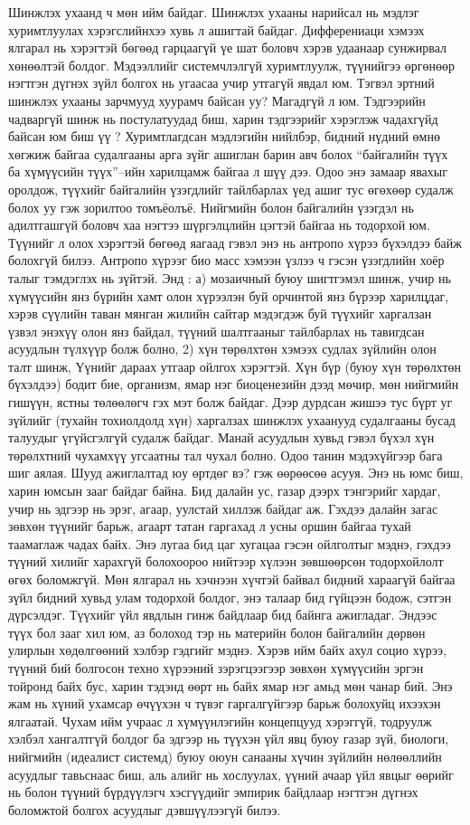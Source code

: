 Шинжлэх ухаанд ч мөн ийм байдаг. Шинжлэх ухааны нарийсал нь мэдлэг хуримтлуулах хэрэгслийнхээ хувь л ашигтай байдаг. Дифферениаци хэмээх ялгарал нь хэрэгтэй бөгөөд гарцаагүй үе шат боловч хэрэв удаанаар сунжирвал хөнөөлтэй болдог. Мэдээллийг системчлэлгүй хуримтлуулж, түүнийгээ өргөнөөр нэгтгэн дүгнэх зүйл болгох нь угаасаа учир утгагүй явдал юм. Тэгвэл эртний шинжлэх ухааны зарчмууд хуурамч байсан уу? Магадгүй л юм. Тэдгээрийн чадваргүй шинж нь постулатуудад биш, харин тэдгээрийг хэрэглэж чадахгүйд байсан юм биш үү ? Хуримтлагдсан мэдлэгийн нийлбэр, бидний нүдний өмнө хөгжиж байгаа судалгааны арга зүйг ашиглан барин авч болох “байгалийн түүх ба хүмүүсийн түүх”–ийн харилцамж байгаа л шүү дээ. Одоо энэ замаар явахыг оролдож, түүхийг байгалийн үзэгдлийг тайлбарлах үед ашиг тус өгөхөөр судалж болох уу гэж зорилтоо томъёолъё.
Нийгмийн болон байгалийн үзэгдэл нь адилтгашгүй боловч хаа нэгтээ шүргэлцлийн цэгтэй байгаа нь тодорхой юм. Түүнийг л олох хэрэгтэй бөгөөд яагаад гэвэл энэ нь антропо хүрээ бүхэлдээ байж болохгүй билээ. Антропо хүрээг био масс хэмээн үзлээ ч гэсэн үзэгдлийн хоёр талыг тэмдэглэх нь зүйтэй. Энд : а) мозаичный буюу шигтгэмэл шинж, учир нь хүмүүсийн янз бүрийн хамт олон хүрээлэн буй орчинтой янз бүрээр харилцдаг, хэрэв сүүлийн таван мянган жилийн сайтар мэдэгдэж буй түүхийг харгалзан үзвэл энэхүү олон янз байдал, түүний шалтгааныг тайлбарлах нь тавигдсан асуудлын түлхүүр болж болно, 2) хүн төрөлхтөн хэмээх судлах зүйлийн олон талт шинж, Үүнийг дараах утгаар ойлгох хэрэгтэй. Хүн бүр (буюу хүн төрөлхтөн бүхэлдээ) бодит бие, организм, ямар нэг биоценезийн дээд мөчир, мөн нийгмийн гишүүн, ястны төлөөлөгч гэх мэт болж байдаг. Дээр дурдсан жишээ тус бүрт уг зүйлийг (тухайн тохиолдолд хүн) харгалзах шинжлэх ухаанууд судалгааны бусад талуудыг үгүйсгэлгүй судалж байдаг. Манай асуудлын хувьд гэвэл бүхэл хүн төрөлхтний чухамхүү угсаатны тал чухал болно.
Одоо танин мэдэхүйгээр бага шиг аялая. Шууд ажиглалтад юу өртдөг вэ? гэж өөрөөсөө асууя. Энэ нь юмс биш, харин юмсын зааг байдаг байна. Бид далайн ус, газар дээрх тэнгэрийг хардаг, учир нь эдгээр нь эрэг, агаар, уулстай хиллэж байдаг аж.
Гэхдээ далайн загас зөвхөн түүнийг барьж, агаарт татан гаргахад л усны оршин байгаа тухай таамаглаж чадах байх. Энэ лугаа бид цаг хугацаа гэсэн ойлголтыг мэднэ, гэхдээ түүний хилийг харахгүй болохоороо нийтээр хүлээн зөвшөөрсөн тодорхойлолт өгөх боломжгүй. Мөн ялгарал нь хэчнээн хүчтэй байвал бидний хараагүй байгаа зүйл бидний хувьд улам тодорхой болдог, энэ талаар бид гүйцээн бодож, сэтгэн дүрсэлдэг.
Түүхийг үйл явдлын гинж байдлаар бид байнга ажигладаг. Эндээс түүх бол зааг хил юм, аз болоход тэр нь материйн болон байгалийн дөрвөн улирлын хөдөлгөөний хэлбэр гэдгийг мэднэ. Хэрэв ийм байх ахул социо хүрээ, түүний бий болгосон техно хүрээний зэрэгцээгээр зөвхөн хүмүүсийн эргэн тойронд байх бус, харин тэдэнд өөрт нь байх ямар нэг амьд мөн чанар бий. Энэ жам нь хүний ухамсар өчүүхэн ч түвэг гаргалгүйгээр барьж болохуйц ихээхэн ялгаатай. Чухам ийм учраас л хүмүүнлэгийн концепцууд хэрэггүй, тодруулж хэлбэл хангалтгүй болдог ба эдгээр нь түүхэн үйл явц буюу газар зүй, биологи, нийгмийн (идеалист системд) буюу оюун санааны хүчин зүйлийн нөлөөллийн асуудлыг тавьснаас биш, аль алийг нь хослуулах, үүний ачаар үйл явцыг өөрийг нь болон түүний бүрдүүлэгч хэсгүүдийг эмпирик байдлаар нэгтгэн дүгнэх боломжтой болгох асуудлыг дэвшүүлээгүй билээ.
